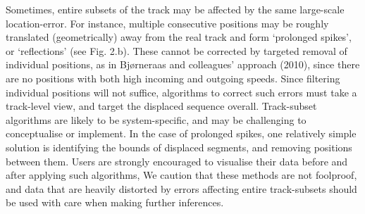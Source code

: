 \documentclass[10pt,paper=a4,headings=standardclasses
]{scrartcl}
\begin{document}
Sometimes, entire subsets of the track may be affected by the same large-scale location-error.
For instance, multiple consecutive positions may be roughly translated (geometrically) away from the real track and form `prolonged spikes', or `reflections' (see Fig. 2.b).
These cannot be corrected by targeted removal of individual positions, as in Bjørneraas and colleagues' approach (2010), since there are no positions with both high incoming and outgoing speeds.
Since filtering individual positions will not suffice, algorithms to correct such errors must take a track-level view, and target the displaced sequence overall.
Track-subset algorithms are likely to be system-specific, and may be challenging to conceptualise or implement.
In the case of prolonged spikes, one relatively simple solution is identifying the bounds of displaced segments, and removing positions between them.
Users are strongly encouraged to visualise their data before and after applying such algorithms, 
We caution that these methods are not foolproof, and data that are heavily distorted by errors affecting entire track-subsets should be used with care when making further inferences.

\end{document}
